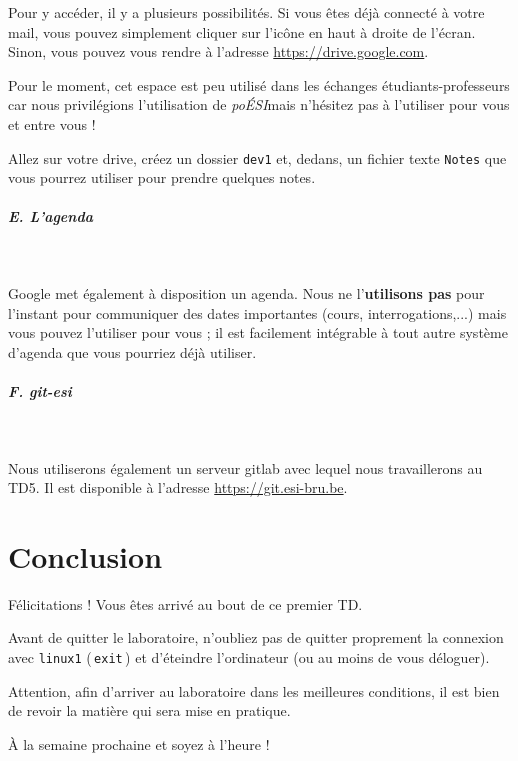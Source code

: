 \documentclass[a4paper,11pt]{article}
\begin{document}
 \par 
 Pour y acc\'eder, il y a plusieurs possibilit\'es. Si vous \^etes d\'ej\`a connect\'e \`a votre mail, vous pouvez simplement cliquer sur l'ic\^one en haut \`a droite de l'\'ecran. Sinon, vous pouvez vous rendre \`a l'adresse \url{https://drive.google.com}.
			
 \par
Pour le moment, cet espace est peu utilis\'e dans les \'echanges \'etudiants-professeurs car nous privil\'egions l'utilisation de \textit{po\'ESI}mais n'h\'esitez pas \`a l'utiliser pour vous et entre vous !
			
\par
\begin{Exercice}{}
Allez sur votre drive, cr\'eez un dossier \verb_dev1_ et, dedans, un fichier texte \verb_Notes_ que vous pourrez utiliser pour prendre quelques notes.
\end{Exercice}

 \par
        
\subparagraph{E. L'agenda} 

\textcolor{white}{.} \par
Google met \'egalement \`a disposition un agenda. Nous ne l'\textbf{utilisons pas} pour l'instant pour communiquer des dates importantes (cours, interrogations,...) mais vous pouvez l'utiliser pour vous ; il est facilement int\'egrable \`a tout autre syst\`eme d'agenda que vous pourriez d\'ej\`a utiliser.
			
\par
\subparagraph{F. git-esi}
\textcolor{white}{.} \par
Nous utiliserons également un serveur gitlab avec lequel nous travaillerons au TD5. Il est disponible à l'adresse \url{https://git.esi-bru.be}.

\par
\section{Conclusion}

Félicitations ! Vous \^etes arriv\'e au bout de ce premier TD.
 \par
Avant de quitter le laboratoire, n'oubliez pas de quitter proprement la connexion avec \verb_linux1_ (\,\verb|exit|\,) et d'\'eteindre l'ordinateur (ou au moins de vous d\'eloguer).
\par
Attention, afin d'arriver au laboratoire dans les meilleures conditions, il est bien de revoir la mati\`ere qui sera mise en pratique. 
 \par
\`A la semaine prochaine et soyez \`a l'heure !
\par
	
	
\end{document}
